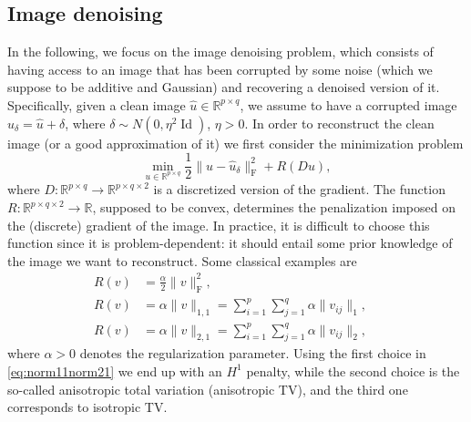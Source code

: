 \documentclass[onefignum,onetabnum]{siamonline250211}
\newcommand{\Id}{\operatorname{Id}}
\newcommand{\R}{\mathbb{R}}
\begin{document}
\subsection{Image denoising}\label{sec:image_denoising} In the following, we focus on the image denoising problem, which consists of having access to an image that has been corrupted by some noise (which we suppose to be additive and Gaussian) and recovering a denoised version of it.
Specifically, given a clean image $\hat u\in \mathbb{R}^{p\times q}$, we assume to have a corrupted image $\hat u_\delta=\hat u + \delta$, where $\delta \sim N(0,\eta^2 \Id)$, $\eta>0$. In order to reconstruct the clean image (or a good approximation of it) we first consider the minimization problem
\begin{equation}\label{eq:image_denoise}
    \min_{u\in\R^{p\times q}} \frac{1}{2}\|u-\hat u_\delta\|_{\mathrm{F}}^2+ R(Du),
\end{equation}
where $D:\mathbb{R}^{p\times q}\to \mathbb{R}^{p\times q\times 2}$ is a discretized version of the gradient. The function $R:\mathbb{R}^{p\times q\times 2} \to \mathbb{R}$, supposed to be convex, determines the penalization imposed on the (discrete) gradient of the image. In practice, it is difficult to choose this function since it is problem-dependent: it should entail some prior knowledge of the image we want to reconstruct. Some classical examples are
\begin{equation}\label{eq:norm11norm21}
\begin{aligned}
R(v) & =\frac{\alpha}{2}\|v\|_{\mathrm{F}}^2,\\
R(v) & =\alpha\|v\|_{1,1}=\sum_{i=1}^{p}\sum_{j=1}^{q}\alpha\|v_{ij}\|_1,\quad \\
R(v) & =\alpha\|v\|_{2,1}=\sum_{i=1}^{p}\sum_{j=1}^{q}\alpha\|v_{ij}\|_2,
\end{aligned}
    \end{equation}
where $\alpha>0$ denotes the regularization parameter. Using the first choice in \cref{eq:norm11norm21} we end up with an $H^1$ penalty, while the second choice is the so-called anisotropic total variation (anisotropic TV), and the third one corresponds to isotropic TV.
\end{document}
